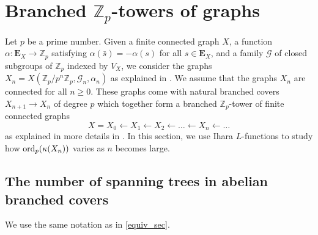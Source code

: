 \documentclass[11pt]{amsart}
\numberwithin{equation}{section}
\theoremstyle{remark}
\theoremstyle{definition}
\begin{document}
\section{Branched \texorpdfstring{$\mathbb{Z}_{p}$}{L}-towers of graphs} \label{br_section}
Let $p$ be a prime number.  Given a finite connected graph $X$, a function $\alpha:\mathbf{E}_{X} \rightarrow \mathbb{Z}_{p}$ satisfying $\alpha(\bar{s}) = -\alpha(s)$ for all $s \in \mathbf{E}_{X}$, and a family $\mathcal{G}$ of closed subgroups of $\mathbb{Z}_{p}$ indexed by $V_{X}$, we consider the graphs $X_{n} = X(\mathbb{Z}_{p}/p^{n}\mathbb{Z}_{p},\mathcal{G}_{n},\alpha_{n})$ as explained in \cite[\S 4.3]{Gambheera/Vallieres:2024}.  We assume that the graphs $X_{n}$ are connected for all $n \ge 0$.  These graphs come with natural branched covers $X_{n+1} \rightarrow X_{n}$ of degree $p$ which together form a branched $\mathbb{Z}_{p}$-tower of finite connected graphs
\begin{equation} \label{z_p_tower}
X = X_{0} \leftarrow X_{1} \leftarrow X_{2} \leftarrow \ldots \leftarrow X_{n} \leftarrow \ldots 
\end{equation}
as explained in more details in \cite[\S 4.3]{Gambheera/Vallieres:2024}.  In this section, we use Ihara $L$-functions to study how ${\rm ord}_{p}(\kappa(X_{n}))$ varies as $n$ becomes large.
\subsection{The number of spanning trees in abelian branched covers} \label{num_of_span}
We use the same notation as in \cref{equiv_sec}.
\end{document}
